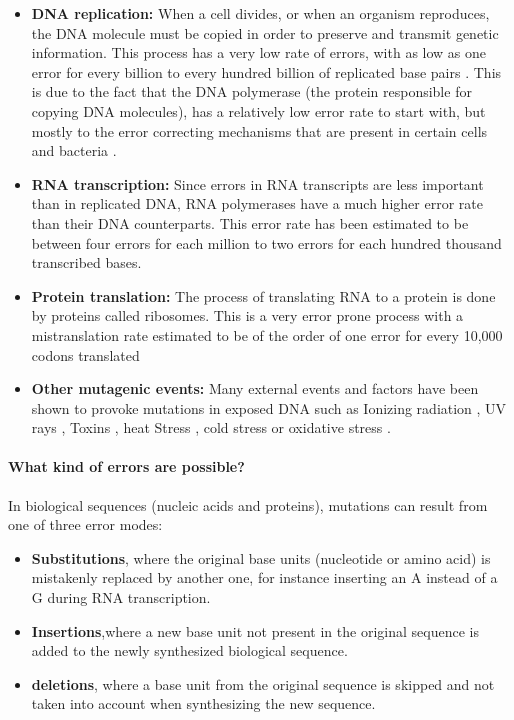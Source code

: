 \documentclass[
  11pt,
  twoside]{scrbook}
\providecommand{\tightlist}{%
  \setlength{\itemsep}{0pt}\setlength{\parskip}{0pt}}
\begin{document}
\begin{itemize}
\item
  \textbf{DNA replication:} When a cell divides, or when an organism reproduces, the DNA molecule must be copied in order to preserve and transmit genetic information. This process has a very low rate of errors, with as low as one error for every billion to every hundred billion of replicated base pairs \autocite{fijalkowska2012}. This is due to the fact that the DNA polymerase (the protein responsible for copying DNA molecules), has a relatively low error rate to start with, but mostly to the error correcting mechanisms that are present in certain cells and bacteria \autocite{pray2008dna}.
\item
  \textbf{RNA transcription:} Since errors in RNA transcripts are less important than in replicated DNA, RNA polymerases have a much higher error rate than their DNA counterparts. This error rate has been estimated to be between four errors for each million \autocite{gout2013} to two errors for each hundred thousand \autocite{gout2017} transcribed bases.
\item
  \textbf{Protein translation:} The process of translating RNA to a protein is done by proteins called ribosomes. This is a very error prone process with a mistranslation rate estimated to be of the order of one error for every 10,000 codons translated \autocite{shcherbakovRibosomalMistranslationLeads2019}
\item
  \textbf{Other mutagenic events:} Many external events and factors have been shown to provoke mutations in exposed DNA such as Ionizing radiation \autocite{desouky2015}, UV rays \autocite{kiefer2007}, Toxins \autocite{bennett2003}, heat Stress \autocite{kantidze2016}, cold stress \autocite{gregory1994} or oxidative stress \autocite{gafter-gvili2013}.
\end{itemize}

\hypertarget{what-kind-of-errors-are-possible}{%
\paragraph{What kind of errors are possible?}\label{what-kind-of-errors-are-possible}}

In biological sequences (nucleic acids and proteins), mutations can result from one of three error modes:

\begin{itemize}
\tightlist
\item
  \textbf{Substitutions}, where the original base units (nucleotide or amino acid) is mistakenly replaced by another one, for instance inserting an A instead of a G during RNA transcription.
\item
  \textbf{Insertions},where a new base unit not present in the original sequence is added to the newly synthesized biological sequence.
\item
  \textbf{deletions}, where a base unit from the original sequence is skipped and not taken into account when synthesizing the new sequence.
\end{itemize}
\end{document}
